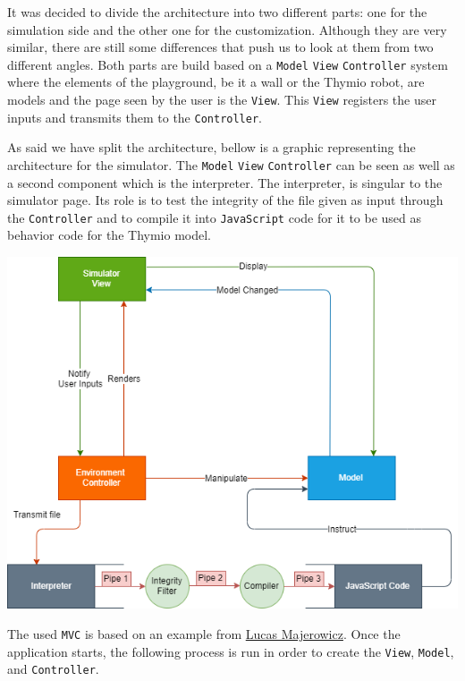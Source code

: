 \documentclass{scrreprt}
\begin{document}
It was decided to divide the architecture into two different parts: one for the simulation side and the other one for the customization. Although they are very similar, there are still some differences that push us to look at them from two different angles. 
Both parts are build based on a \texttt{Model} \texttt{View} \texttt{Controller} system where the elements of the playground, be it a wall or the Thymio robot, are models and the page seen by the user is the \texttt{View}. This \texttt{View} registers the user inputs and transmits them to the \texttt{Controller}. 

As said we have split the architecture, bellow is a graphic representing the architecture for the simulator. The \texttt{Model} \texttt{View} \texttt{Controller} can be seen as well as a second component which is the interpreter. 
The interpreter, is singular to the simulator page. Its role is to test the integrity of the file given as input through the \texttt{Controller} and to compile it into \texttt{JavaScript} code for it to be used as behavior code for the Thymio model.

\begin{center}
  \includegraphics[width=\textwidth]{./architecture_proposal-Page-1}
\end{center}

The used \texttt{MVC} is based on an example from \href{https://github.com/lucasmajerowicz/threejs-mvc-example}{Lucas Majerowicz}. Once the application starts, the following process is run in order to create the \texttt{View}, \texttt{Model}, and \texttt{Controller}.
\end{document}
